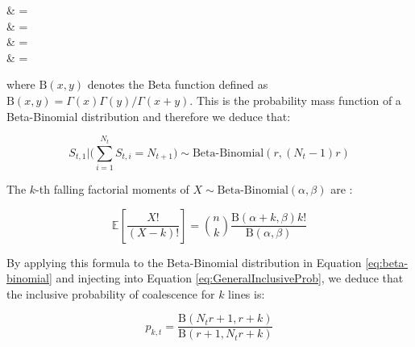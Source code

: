 \documentclass{article}
\let\oldalign\align
\let\oldendalign\endalign
\renewenvironment{align}{\linenomathNonumbers\oldalign}{\oldendalign\endlinenomath}
\renewcommand{\eqref}[1]{\ref{#1}}
\begin{document}
{\allowdisplaybreaks
	\begin{align}
		\bigg[ S_{t,1} = s \bigg| \sum_{i=1}^{N_t} S_{t,i} = N_{t+1} \bigg]
			& =  \nonumber\\
			& =  \nonumber\\
			& =    \nonumber\\
			& =  
	\end{align}
}

\noindent where  $\mathrm{B}(x,y)$ denotes the Beta function defined as $\mathrm{B}(x,y)=\Gamma(x)\Gamma(y)/\Gamma(x+y)$. This is the probability mass function of a Beta-Binomial distribution and therefore we deduce that:

\begin{equation}
S_{t,1} \bigg| \bigg(\sum_{i=1}^{N_t} S_{t,i} = N_{t+1} \bigg) \sim \text{Beta-Binomial}(r, (N_t - 1)r)
\label{eq:beta-binomial}
\end{equation}

The $k$-th falling factorial moments of $X \sim \text{Beta-Binomial}(\alpha,\beta)$ are \citep{Tripathi1994}:

\begin{equation}
	\mathbb{E}\left[\frac{X!}{(X-k)!}\right]=\binom{n}{k} \frac{\mathrm{B}(\alpha+k,\beta)k!}{\mathrm{B}(\alpha,\beta)}
\end{equation}

By applying this formula to the Beta-Binomial distribution in Equation \eqref{eq:beta-binomial}
and injecting into Equation \eqref{eq:GeneralInclusiveProb}, we deduce that the inclusive probability of coalescence for $k$ lines is:

\begin{equation}
p_{k,t}=
\frac{\mathrm{B}(N_t r+1,r+k)}{\mathrm{B}(r+1,N_t r+k)}
\label{eq:NegBinInclusiveProb}
\end{equation}
\end{document}
